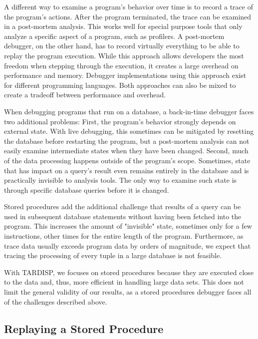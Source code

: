 \documentclass[english]{sig-alternate-05-2015}
\newcommand{\todo}[2][]{\pdfmargincomment[author={#1}]{#2}}
\newcommand{\tool}{TARDISP}
\begin{document}
A different way to examine a program's behavior over time is to record a trace of the program's actions.
After the program terminated, the trace can be examined in a post-mortem analysis.
This works well for special purpose tools that only analyze a specific aspect of a program, such as profilers.
A post-mortem debugger, on the other hand, has to record virtually everything to be able to replay the program execution.
While this approach allows developers the most freedom when stepping through the execution, it creates a large overhead on performance and memory.
Debugger implementations using this approach exist for different programming languages.
%
Both approaches can also be mixed to create a tradeoff between performance and overhead\todo{cite}.

When debugging programs that run on a database, a back-in-time debugger faces two additional problems:
First, the program's behavior strongly depends on external state.
With live debugging, this sometimes can be mitigated by resetting the database before restarting the program, but a post-mortem analysis can not easily examine intermediate states when they have been changed.
Second, much of the data processing happens outside of the program's scope.
Sometimes, state that has impact on a query's result even remains entirely in the database and is practically invisible to analysis tools.
The only way to examine such state is through specific database queries before it is changed.

Stored procedures add the additional challenge that results of a query can be used in subsequent database statements without having been fetched into the program.
This increases the amount of "invisible" state, sometimes only for a few instructions, other times for the entire length of the program.
Furthermore, as trace data usually exceeds program data by orders of magnitude, we expect that tracing the processing of every tuple in a large database is not feasible.

With \tool, we focuses on stored procedures because they are executed close to the data and, thus, more efficient in handling large data sets.
This does not limit the general validity of our results, as a stored procedures debugger faces all of the challenges described above.

\subsection{Replaying a Stored Procedure}
\end{document}
